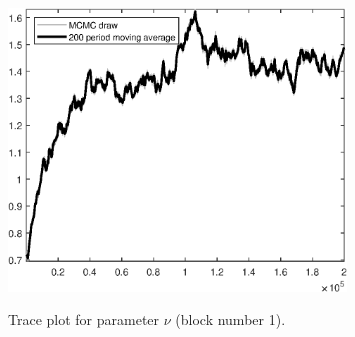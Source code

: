 \begin{figure}[H]
\centering
  \includegraphics[width=0.8\textwidth]{BRS_sectoral_rest/graphs/TracePlot_nu_blck_1}\\
    \caption{Trace plot for parameter $\nu$ (block number 1).}
\end{figure}
